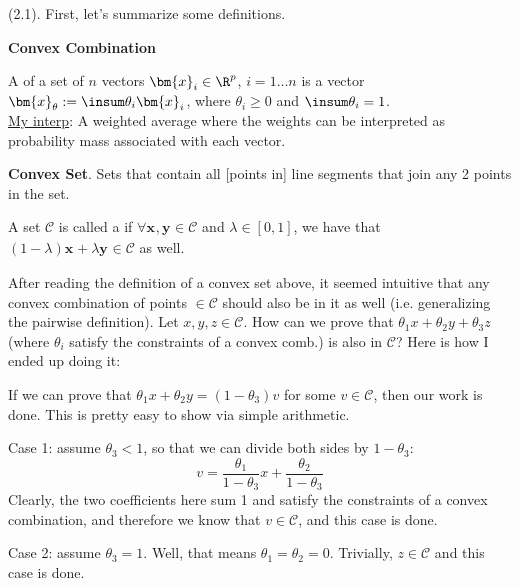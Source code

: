 \documentclass[11pt]{article}
\renewcommand\vec[2][]{\bm{#2}_{#1}}
\newcommand\p{\Needspace{10\baselineskip} \noindent}
\begin{document}
\p {} (2.1). First, let's summarize some definitions.

\textbf{Convex Combination}
\begin{definition}[-1.em]
	A  of a set of $n$ vectors $\vec[i]{x} \in \R^p$, $i=1\ldots n$ is a vector $\vec[\theta]{x} := \insum \theta_i \vec[i]{x}$, where $\theta_i \ge 0$ and $\insum \theta_i = 1$.\\ 
	\underline{My interp}: A weighted average where the weights can be interpreted as probability mass associated with each vector.
\end{definition}

\textbf{Convex Set}. Sets that contain all [points in] line segments that join any 2 points in the set.
\begin{definition}[-2.0em]
	A set $\mathcal C$ is called a  if $\forall \vec x, \vec y \in \mathcal C$ and $\lambda \in [0, 1]$, we have that $(1 - \lambda) \vec x + \lambda \vec y \in \mathcal C$ as well. 
\end{definition}

\begin{example}
	After reading the definition of a convex set above, it seemed intuitive that any convex combination of points $\in \mathcal C$ should also be in it as well (i.e. generalizing the pairwise definition). Let $x, y, z \in \mathcal C$. How can we prove that $\theta_1 x + \theta_2 y + \theta_3 z$ (where $\theta_i$ satisfy the constraints of a convex comb.) is also in $\mathcal C$? Here is how I ended up doing it:
	
	\begin{compactitem}
		\item If we can prove that $\theta_1 x + \theta_2 y = (1 - \theta_3) v$ for some $v \in \mathcal{C}$, then our work is done. This is pretty easy to show via simple arithmetic. 
		\item Case 1: assume $\theta_3 < 1$, so that we can divide both sides by $1 - \theta_3$:
		$$
			v = \frac{\theta_1}{1 - \theta_3} x	+ \frac{\theta_2}{1 - \theta_3}
		$$
		Clearly, the two coefficients here sum 1 and satisfy the constraints of a convex combination, and therefore we know that $v \in \mathcal C$, and this case is done. 
		
		\item Case 2: assume $\theta_3 = 1$. Well, that means $\theta_1 = \theta_2 = 0$. Trivially, $z \in \mathcal C$ and this case is done. 
	\end{compactitem}
\end{example}
\end{document}
